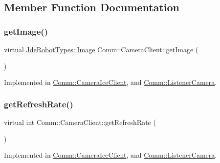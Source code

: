 \subsection{Member Function Documentation}
\mbox{\label{class_comm_1_1_camera_client_a1947976aa6b31734b9938091e63782e2}} 
\subsubsection{\texorpdfstring{get\+Image()}{getImage()}}
{\footnotesize\ttfamily virtual \hyperlink{class_jde_robot_types_1_1_image}{Jde\+Robot\+Types\+::\+Image} Comm\+::\+Camera\+Client\+::get\+Image (\begin{DoxyParamCaption}{ }\end{DoxyParamCaption})\hspace{0.3cm}{\ttfamily [pure virtual]}}



Implemented in \hyperlink{class_comm_1_1_camera_ice_client_aff1f3ff0d95d8a04aacfe5cfc9955740}{Comm\+::\+Camera\+Ice\+Client}, and \hyperlink{class_comm_1_1_listener_camera_a854d67843d55c98a0020661b8fb7fca9}{Comm\+::\+Listener\+Camera}.

\mbox{\label{class_comm_1_1_camera_client_afa8d54f4d72921376ec35607897ab5bc}} 
\subsubsection{\texorpdfstring{get\+Refresh\+Rate()}{getRefreshRate()}}
{\footnotesize\ttfamily virtual int Comm\+::\+Camera\+Client\+::get\+Refresh\+Rate (\begin{DoxyParamCaption}{ }\end{DoxyParamCaption})\hspace{0.3cm}{\ttfamily [pure virtual]}}



Implemented in \hyperlink{class_comm_1_1_camera_ice_client_a4c6bcb1559bd04fe1b55461352056430}{Comm\+::\+Camera\+Ice\+Client}, and \hyperlink{class_comm_1_1_listener_camera_a7ba9f0f4210d75cbedba5a016ac60175}{Comm\+::\+Listener\+Camera}.



